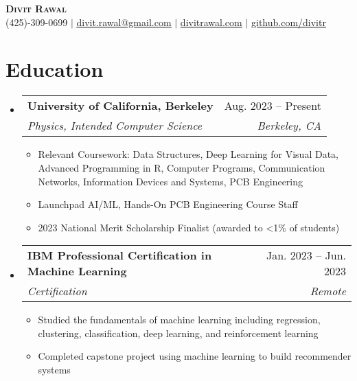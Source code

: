 \documentclass[letterpaper,11pt]{article}
\makeatletter
\newcommand{\resumeItem}[1]{
  \item\small{
    {#1 \vspace{-2pt}}
  }
}
\newcommand{\resumeSubheading}[4]{
  \vspace{-2pt}\item
    \begin{tabular*}{0.97\textwidth}[t]{l@{\extracolsep{\fill}}r}
      \textbf{#1} & #2 \\
      \textit{\small#3} & \textit{\small #4} \\
    \end{tabular*}\vspace{-7pt}
}
\newcommand{\resumeSubHeadingListStart}{\begin{itemize}[leftmargin=0.15in, label={}]}
\newcommand{\resumeSubHeadingListEnd}{\end{itemize}}
\newcommand{\resumeItemListStart}{\begin{itemize}}
\newcommand{\resumeItemListEnd}{\end{itemize}\vspace{-5pt}}
\makeatother
\begin{document}

\begin{center}
    \textbf{\Huge \scshape Divit Rawal} \\ \vspace{1pt}
    \small (425)-309-0699 $|$ \href{mailto:divit.rawal@gmail.com}{\underline{divit.rawal@gmail.com}} $|$ 
    \href{https://www.divitrawal.com}{\underline{divitrawal.com}} $|$
    \href{https://www.github.com/divitr/}{\underline{github.com/divitr}}
\end{center}

\section{Education}
  \resumeSubHeadingListStart
    \resumeSubheading
      {University of California, Berkeley}{Aug. 2023 -- Present}
      {Physics, Intended Computer Science}{Berkeley, CA}
      \resumeItemListStart
        \resumeItem{Relevant Coursework: Data Structures, Deep Learning for Visual Data, Advanced Programming in R, Computer Programs, Communication Networks,  Information Devices and Systems, PCB Engineering}
        \resumeItem{Launchpad  AI/ML, Hands-On PCB Engineering Course Staff}
        \resumeItem{2023 National Merit Scholarship Finalist (awarded to \textless 1\% of students)}
      \resumeItemListEnd
  \resumeSubHeadingListEnd

  \resumeSubHeadingListStart
    \resumeSubheading
      {IBM Professional Certification in Machine Learning}{Jan. 2023 -- Jun. 2023}
      {Certification}{Remote}
      \resumeItemListStart
        \resumeItem{Studied the fundamentals of machine learning including regression, clustering, classification, deep learning, and reinforcement learning}
        \resumeItem{Completed capstone project using machine learning to build recommender systems}
      \resumeItemListEnd
  \resumeSubHeadingListEnd
\end{document}
